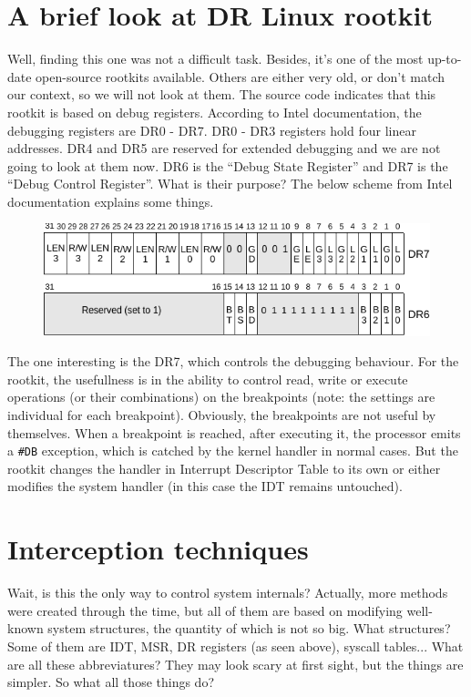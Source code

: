 \documentclass[12pt]{book}
\begin{document}
  \chapter{A brief look at DR Linux rootkit}
  
  Well, finding this one was not a difficult task. Besides, it's one of the
  most up-to-date open-source rootkits available. Others are either very old,
  or don't match our context, so we will not look at them. The source code
  indicates that this rootkit is based on debug registers. According to Intel
  documentation, the debugging registers are DR0 - DR7. DR0 - DR3 registers
  hold four linear addresses. DR4 and DR5 are reserved for extended debugging
  and we are not going to look at them now. DR6 is the ``Debug State
  Register'' and DR7 is the ``Debug Control Register''. What is their purpose?
  The below scheme from Intel documentation explains some things.
  \begin{figure}[h]
    \includegraphics[width=\linewidth, keepaspectratio]{dregs}
  \end{figure}
  The one interesting is the DR7, which controls the debugging behaviour. For
  the rootkit, the usefullness is in the ability to control read, write or
  execute operations (or their combinations) on the breakpoints (note: the
  settings are individual for each breakpoint). Obviously, the breakpoints are
  not useful by themselves. When a breakpoint is reached, after executing it,
  the processor emits a \verb!#DB! exception, which is catched by the kernel
  handler in normal cases. But the rootkit changes the handler in Interrupt
  Descriptor Table to its own or either modifies the system handler (in this
  case the IDT remains untouched).

  \chapter{Interception techniques}

  Wait, is this the only way to control system internals? Actually, more
  methods were created through the time, but all of them are based on
  modifying well-known system structures, the quantity of which is not so
  big. What structures? Some of them are IDT, MSR, DR registers (as seen
  above), syscall tables... What are all these abbreviatures? They may look
  scary at first sight, but the things are simpler. So what all those things
  do?
\end{document}
